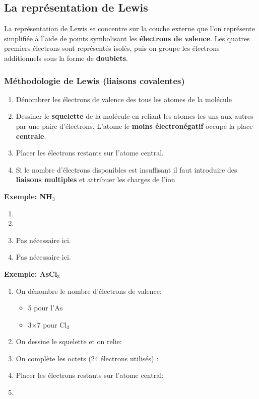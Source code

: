 \documentclass[10pt,a4paper]{book}
\begin{document}
\subsection{La représentation de Lewis}
La représentation de Lewis se concentre sur la couche externe que l'on représente simplifiée à l'aide de points symbolisant les \textbf{électrons de valence}. Les quatres premiers électrons sont représentés isolés, puis on groupe les électrons additionnels sous la forme de \textbf{doublets}.
\subsubsection{Méthodologie de Lewis (liaisons covalentes)}
\begin{enumerate}
\item Dénombrer les électrons de valence des tous les atomes de la molécule
\item Dessiner le \textbf{squelette} de la molécule en reliant les atomes les uns aux autres par une paire d'électrons. L'atome le \textbf{moins électronégatif} occupe la place \textbf{centrale}.
\item Placer les électrons restants sur l'atome central.
\item Si le nombre d'électrons disponibles est insuffisant il faut introduire des \textbf{liaisons multiples} et attribuer les charges de l'ion
\end{enumerate}
\textbf{Exemple: NH$_3$}
\begin{center}
\begin{enumerate}
\item {}
\item {}
\item Pas nécessaire ici.
\item Pas nécessaire ici.
\end{enumerate}
\end{center}
\textbf{Exemple: AsCl$_3$}
\begin{enumerate}
\item On dénombre le nombre d'électrons de valence:
\begin{itemize}
	\item 5 pour l'As
	\item 3$\times$7 pour Cl$_3$
\end{itemize}
\item On dessine le squelette et on relie: 
\item On complète les octets (24 électrons utilisés) : 
\item Placer les électrons restants sur l’atome central: 
\item %
\end{enumerate}
\end{document}

